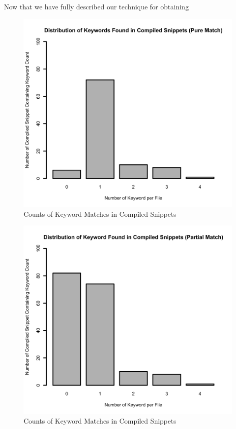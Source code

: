 \documentclass[10pt, conference]{IEEEtran}
\begin{document}
Now that we have fully described our technique for obtaining 
\begin{figure}[h]
\begin{center}
\includegraphics[width=0.9\linewidth]{CompiledKeywordDistPureMatch.png}
\caption{Counts of Keyword Matches in Compiled Snippets}
\end{center}
\end{figure}

\begin{figure}[h]
\begin{center}
\includegraphics[width=0.9\linewidth]{CompiledKeywordDistPartialMatch.png}
\caption{Counts of Keyword Matches in Compiled Snippets}
\end{center}
\end{figure}
\end{document}
